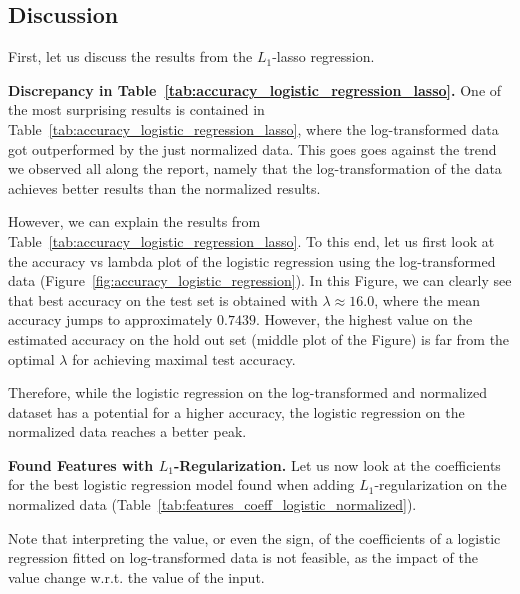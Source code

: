 \subsection{Discussion}

First, let us discuss the results from the $L_1$-lasso regression.

\textbf{Discrepancy in Table~\ref{tab:accuracy_logistic_regression_lasso}.}
One of the most surprising results is contained in Table~\ref{tab:accuracy_logistic_regression_lasso}, where the log-transformed data got outperformed by the just normalized data. This goes goes against the trend we observed all along the report, namely that the log-transformation of the data achieves better results than the normalized results.

However, we can explain the results from Table~\ref{tab:accuracy_logistic_regression_lasso}. To this end, let us first look at the accuracy vs lambda plot of the logistic regression using the log-transformed data (Figure~\ref{fig:accuracy_logistic_regression}).
In this Figure, we can clearly see that best accuracy on the test set is obtained with $\lambda \approx 16.0$, where the mean accuracy jumps to approximately $0.7439$.
However, the highest value on the estimated accuracy on the hold out set (middle plot of the Figure) is far from the optimal $\lambda$ for achieving maximal test accuracy. 



Therefore, while the logistic regression on the log-transformed and normalized dataset has a potential for a higher accuracy, the logistic regression on the normalized data reaches a better peak. 

\textbf{Found Features with $L_1$-Regularization.}
Let us now look at the coefficients for the best logistic regression model found when adding $L_1$-regularization on the normalized data (Table~\ref{tab:features_coeff_logistic_normalized}).

Note that interpreting the value, or even the sign, of the coefficients of a logistic regression fitted on log-transformed data is not feasible, as the impact of the value change w.r.t. the value of the input.

